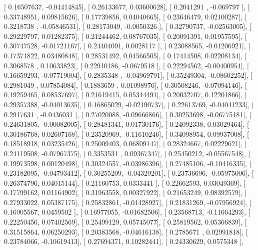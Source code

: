 \documentclass{article}
\begin{document}
       [ 0.16507637, -0.04414845],
       [ 0.26133677,  0.03600628],
       [ 0.2041291 , -0.069797  ],
       [ 0.33748951,  0.09815626],
       [ 0.17739856,  0.04040665],
       [ 0.23646479,  0.02100287],
       [ 0.3218738 , -0.05846531],
       [ 0.28173049, -0.0050326 ],
       [ 0.32790737, -0.02563005],
       [ 0.29229797,  0.01282375],
       [ 0.21244462,  0.08767035],
       [ 0.20091391,  0.01957595],
       [ 0.30747528, -0.01721167],
       [ 0.24404091,  0.0028117 ],
       [ 0.23088565, -0.01206921],
       [ 0.17371822,  0.03480848],
       [ 0.28531492,  0.04566505],
       [ 0.17414508,  0.02208134],
       [ 0.3068578 ,  0.10633823],
       [ 0.22910186, -0.0679518 ],
       [ 0.22294562, -0.00400954],
       [ 0.16659293, -0.07719004],
       [ 0.2835348 , -0.04969791],
       [ 0.35249304, -0.08602252],
       [ 0.2981049 ,  0.07854084],
       [ 0.1883659 ,  0.01098976],
       [ 0.30508246, -0.07094146],
       [ 0.19259465,  0.08537697],
       [ 0.21619415,  0.05344491],
       [ 0.20032707,  0.12201866],
       [ 0.29357388, -0.04013635],
       [ 0.16865029, -0.02190737],
       [ 0.22613769, -0.04041233],
       [ 0.2917631 , -0.0436031 ],
       [ 0.27020088, -0.09666866],
       [ 0.30253698, -0.06775181],
       [ 0.24631805, -0.00082005],
       [ 0.28481341,  0.01730176],
       [ 0.24092338,  0.03029464],
       [ 0.30186768,  0.02607168],
       [ 0.23520969, -0.11610246],
       [ 0.34098954,  0.09937008],
       [ 0.18518918,  0.03235426],
       [ 0.25009403,  0.06809147],
       [ 0.28324667,  0.02229621],
       [ 0.24119508, -0.07967375],
       [ 0.3353531 ,  0.09367347],
       [ 0.25450212, -0.05567548],
       [ 0.19973598,  0.00120498],
       [ 0.30324557, -0.03986396],
       [ 0.27485106, -0.10416335],
       [ 0.23182095, -0.04793412],
       [ 0.30255209, -0.04329201],
       [ 0.23736696, -0.05975006],
       [ 0.26374796,  0.04015144],
       [ 0.21160753,  0.0333441 ],
       [ 0.22662593,  0.03049369],
       [ 0.17799162,  0.01164902],
       [ 0.31963558,  0.00327922],
       [ 0.21653249,  0.08392579],
       [ 0.27933022,  0.05387175],
       [ 0.25832861, -0.01428927],
       [ 0.21831269, -0.07956924],
       [ 0.16905567,  0.0459502 ],
       [ 0.16977055, -0.01682506],
       [ 0.23568713, -0.11664293],
       [ 0.22250456,  0.07402569],
       [ 0.25499129,  0.05745077],
       [ 0.25819562,  0.05366839],
       [ 0.31515864,  0.06250293],
       [ 0.20383568, -0.04616138],
       [ 0.2785671 ,  0.02991818],
       [ 0.23784066, -0.10619413],
       [ 0.27694371,  0.10282441],
       [ 0.24330629,  0.0575348 ],
\end{document}
